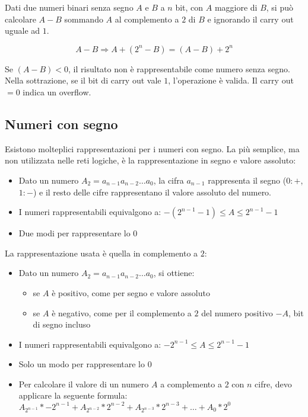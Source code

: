 \documentclass{article}
\begin{document}
Dati due numeri binari senza segno $A$ e $B$ a $n$ bit, con $A$ maggiore di $B$, si può calcolare $A - B$ sommando $A$ al complemento a $2$ di $B$ e ignorando il carry out uguale ad $1$.

$$
A - B \Rightarrow A + (2^n - B) = (A - B) + 2^n
$$

\noindent
Se $(A - B) < 0$, il risultato non è rappresentabile come numero senza segno.
Nella sottrazione, se il bit di carry out vale $1$, l'operazione è valida. Il carry out $=0$ indica un overflow.

\subsection{Numeri con segno}

Esistono molteplici rappresentazioni per i numeri con segno.
La più semplice, ma non utilizzata nelle reti logiche, è la rappresentazione in segno e valore assoluto:

\begin{itemize}
    \item Dato un numero $A_{2} = a_{n-1} a_{n-2} \dots a_0$, la cifra $a_{n-1}$ rappresenta il segno ($0:+$,$1:-$) e il resto delle cifre rappresentano il valore assoluto del numero.
    \item I numeri rappresentabili equivalgono a: $-(2^{n-1} - 1) \leq A \leq 2^{n-1} - 1$
    \item Due modi per rappresentare lo $0$
\end{itemize}

\noindent
La rappresentazione usata è quella in complemento a $2$:

\begin{itemize}
    \item Dato un numero $A_{2} = a_{n-1} a_{n-2} \dots a_0$, si ottiene:

    \begin{itemize}
        \item se $A$ è positivo, come per segno e valore assoluto
        \item se $A$ è negativo, come per il complemento a $2$ del numero positivo $-A$, bit di segno incluso
    \end{itemize}

    \item I numeri rappresentabili equivalgono a: $-2^{n-1} \leq A \leq 2^{n-1} - 1$
    \item Solo un modo per rappresentare lo $0$
    \item Per calcolare il valore di un numero $A$ a complemento a $2$ con $n$ cifre, devo applicare la seguente formula: $A_{2^{n-1}} * -2^{n-1} + A_{2^{n-2}} * 2^{n-2} + A_{2^{n-3}} * 2^{n-3} + \dots + A_0 * 2^0$
\end{itemize}
\end{document}
